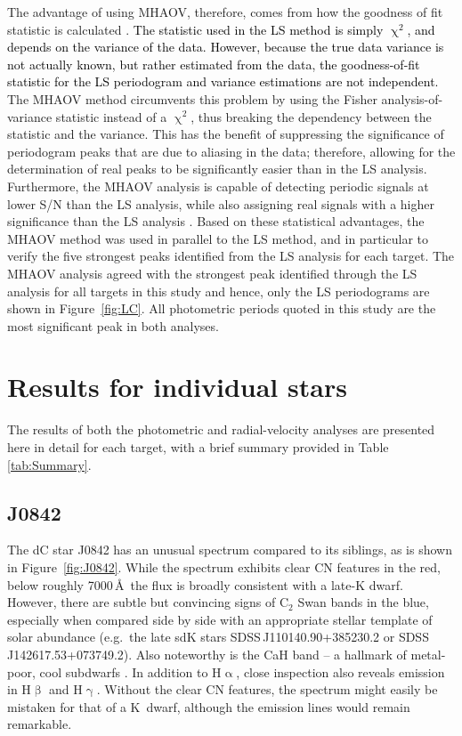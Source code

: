 \documentclass[fleqn,usenatbib,useAMS]{mnras}
\newcommand{\lw}[1]{\textcolor{black}{#1}}
\begin{document}
The advantage of using MHAOV, therefore, comes from how the goodness of fit statistic is calculated \citep{Lachowicz2006}.  \lw{The statistic used in the LS method is simply $\upchi^2$, and depends on the variance of the data.  However, because the true data variance is not actually known, but rather estimated from the data, the goodness-of-fit statistic for the LS periodogram and variance estimations are not independent.}  The MHAOV method circumvents this problem by using the Fisher analysis-of-variance statistic instead of a $\upchi^2$, thus breaking the dependency between the statistic and the variance.  This has the benefit of suppressing the significance of periodogram peaks that are due to aliasing in the data; therefore, allowing for the determination of real peaks to be significantly easier than in the LS analysis.  Furthermore, the MHAOV analysis is capable of detecting periodic signals at lower S/N than the LS analysis, while also assigning real signals with a higher significance than the LS analysis \citep{Schwarz1996}.  Based on these statistical advantages, the MHAOV method was used in parallel to the LS method, and in particular to verify the five strongest peaks identified from the LS analysis for each target.  The MHAOV analysis agreed with the strongest peak identified through the LS analysis for all targets in this study and hence, only the LS periodograms are shown in Figure~\ref{fig:LC}.  All photometric periods quoted in this study are the most significant peak in both analyses.  







\section{Results for individual stars}

The results of both the photometric and radial-velocity analyses are presented here in detail for each target, with a brief summary provided in Table \ref{tab:Summary}.  

\subsection{J0842}

The dC star J0842 has an unusual spectrum compared to its siblings, as is shown in Figure~\ref{fig:J0842}.  While the spectrum exhibits clear CN features in the red, below roughly 7000\,\AA \ the flux is broadly consistent with a late-K dwarf.  However, there are subtle but convincing signs of C$_2$ Swan bands in the blue, especially when compared side by side with an appropriate stellar template of solar abundance (e.g.\ the late sdK stars SDSS\,J110140.90+385230.2 or SDSS\,J142617.53+073749.2).  Also noteworthy is the CaH band -- a hallmark of metal-poor, cool subdwarfs \citep{Reid05,Lepine07}.  In addition to H$\upalpha$, close inspection also reveals emission in H$\upbeta$ and H$\upgamma$.  Without the clear CN features, the spectrum might easily be mistaken for that of a K~dwarf, although the emission lines would remain remarkable.
\end{document}
